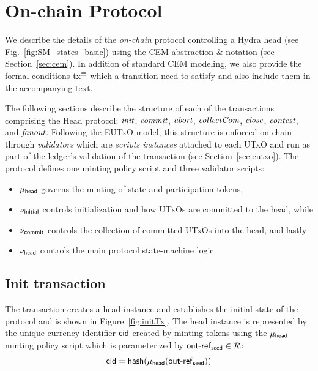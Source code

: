 \section{On-chain Protocol}\label{sec:on-chain}


We describe the details of the \emph{on-chain} protocol controlling a
Hydra head (see Fig.~\ref{fig:SM_states_basic}) using the CEM abstraction \&
notation (see Section~\ref{sec:cem}). In addition of standard CEM modeling, we
also provide the formal conditions $\mathrm{tx}^\equiv$ which a transition need to
satisfy and also include them in the accompanying text.

The following sections describe the structure of each of the transactions
comprising the Head protocol: $\textit{init}{}$, $\textit{commit}{}$, $\textit{abort}{}$,
$\textit{collectCom}{}$, $\textit{close}{}$, $\textit{contest}{}$, and $\textit{fanout}{}$. Following
the EUTxO model, this structure is enforced on-chain through \emph{validators}
which are \emph{scripts instances} attached to each UTxO and run as part of the
ledger's validation of the transaction (see Section~\ref{sec:eutxo}). The
protocol defines one minting policy script and three validator scripts:
\begin{itemize}
	\item $\mu_\mathsf{head}$ governs the minting of state and participation tokens,
	\item $\nu_{\mathsf{initial}}$ controls initialization and how UTxOs are committed to the head, while
	\item $\nu_{\mathsf{commit}}$ controls the collection of committed UTxOs into the head, and lastly
	\item $\nu_\mathsf{head}$ controls the main protocol state-machine logic.
\end{itemize}

\subsection{Init transaction}\label{sec:init-tx}

The \mtxInit{} transaction creates a head instance and establishes the initial
state of the protocol and is shown in Figure~\ref{fig:initTx}. The head
instance is represented by the unique currency identifier $\mathsf{cid}$ created by
minting tokens using the $\mu_\mathsf{head}$ minting policy script which is parameterized
by $\mathsf{out\textsf{-}{}ref}_{\mathsf{seed}} \in \mathcal{R}$:
\[
	\mathsf{cid} = \mathsf{hash}(\mu_\mathsf{head}(\mathsf{out\textsf{-}{}ref}_{\mathsf{seed}}))
\]

